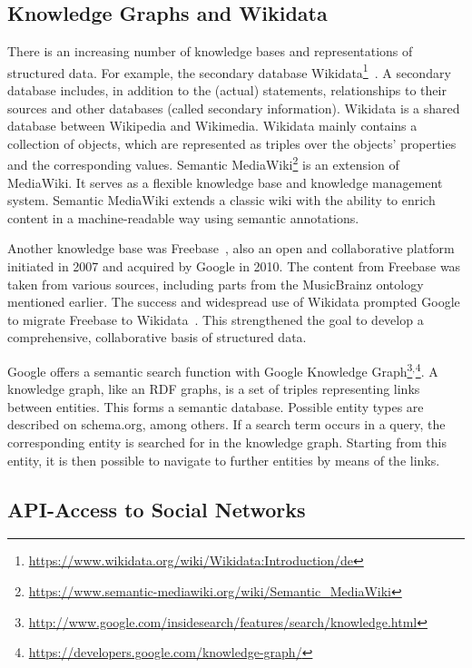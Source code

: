 \documentclass[a4paper,USenglish]{tgdk-v2021}
\newcommand{\myurl}[1]{\footnote{\url{#1}}}
\begin{document}
\subsection{Knowledge Graphs and Wikidata}

There is an increasing number of knowledge bases and representations of structured data.
For example, the secondary database Wikidata\myurl{https://www.wikidata.org/wiki/Wikidata:Introduction/de}~\cite{DBLP:journals/cacm/VrandecicK14}.
A secondary database includes, in addition to the (actual) statements, relationships to their sources and other databases (called secondary information). 
Wikidata is a shared database between Wikipedia and Wikimedia. 
Wikidata mainly contains a collection of objects, which are represented as triples over the objects' properties and the corresponding values. 
Semantic MediaWiki\myurl{https://www.semantic-mediawiki.org/wiki/Semantic_MediaWiki} is an extension of MediaWiki. 
It serves as a flexible knowledge base and knowledge management system. 
Semantic MediaWiki extends a classic wiki with the ability to enrich content in a machine-readable way using semantic annotations. 
  
Another knowledge base was Freebase~\cite{DBLP:conf/sigmod/BollackerEPST08-freebase,DBLP:conf/aaai/BollackerCT07-freebase}, also an open and collaborative platform initiated in 2007 and acquired by Google in 2010.
The content from Freebase was taken from various sources, including parts from the MusicBrainz ontology mentioned earlier.
The success and widespread use of Wikidata prompted Google to migrate Freebase to Wikidata~\cite{DBLP:conf/www/TanonVSSP16}.
This strengthened the goal to develop a comprehensive, collaborative basis of structured data.

Google offers a semantic search function with Google Knowledge Graph\myurl{http://www.google.com/insidesearch/features/search/knowledge.html}$^,$\myurl{https://developers.google.com/knowledge-graph/}.
A knowledge graph, like an RDF graphs, is a set of triples representing links between entities.
This forms a semantic database.
Possible entity types are described on schema.org, among others.
If a search term occurs in a query, the corresponding entity is searched for in the knowledge graph. 
Starting from this entity, it is then possible to navigate to further entities by means of the links. 

\subsection{API-Access to Social Networks} 
\end{document}
